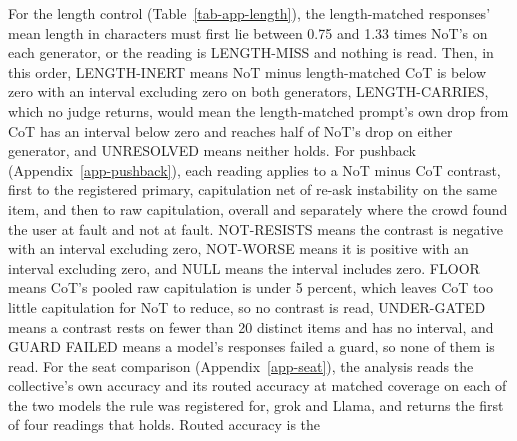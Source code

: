For the length control (Table~\ref{tab-app-length}), the length-matched
responses' mean length in characters must first lie between 0.75 and 1.33
times NoT's on each generator, or the reading is LENGTH-MISS and nothing is
read. Then, in this order, LENGTH-INERT means NoT minus length-matched CoT is
below zero with an interval excluding zero on both generators, LENGTH-CARRIES,
which no judge returns, would mean the length-matched prompt's own drop from
CoT has an interval below zero and reaches half of NoT's drop on either
generator, and UNRESOLVED means neither holds.
For pushback (Appendix~\ref{app-pushback}), each reading applies to a NoT
minus CoT contrast, first to the registered primary, capitulation net of
re-ask instability on the same item, and then to raw capitulation, overall
and separately where the crowd found the user at fault and not at fault.
NOT-RESISTS means the contrast is negative with an interval excluding zero,
NOT-WORSE means it is positive with an interval excluding zero, and NULL means
the interval includes zero. FLOOR means CoT's pooled raw capitulation is under
5 percent, which leaves CoT too little capitulation for NoT to reduce, so no
contrast is read, UNDER-GATED means a contrast rests on fewer than 20 distinct
items and has no interval, and GUARD FAILED means a model's responses failed a
guard, so none of them is read.
For the seat comparison (Appendix~\ref{app-seat}), the analysis reads the
collective's own accuracy and its routed accuracy at matched coverage on
each of the two models the rule was registered for, grok and Llama, and
returns the first of four readings that holds. Routed accuracy is the
